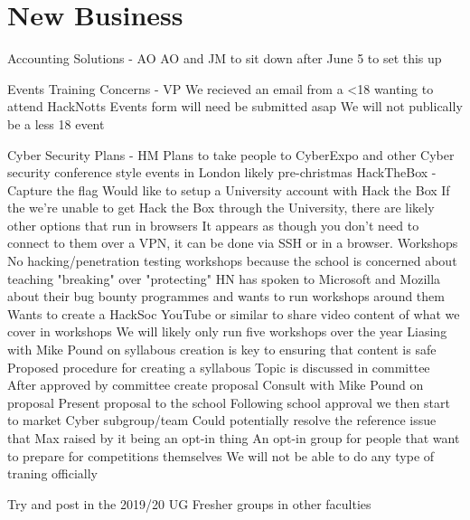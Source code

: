\documentclass[11pt,hacksoc]{meetingmins}
\begin{document}
\section{New Business}
\begin{items}
  \item Accounting Solutions - AO
    \subitem AO and JM to sit down after June 5 to set this up
  \item Events Training Concerns - VP
    \subitem We recieved an email from a <18 wanting to attend HackNotts
    \subitem Events form will need be submitted asap
    \subitem We will not publically be a less 18 event
  \item Cyber Security Plans - HM
    \subitem Plans to take people to CyberExpo and other Cyber security conference style events in London
      \subsubitem likely pre-christmas
    \subitem HackTheBox - Capture the flag
      \subsubitem Would like to setup a University account with Hack the Box
      \subsubitem If the we're unable to get Hack the Box through the University, there are likely other options that run in browsers
      \subsubitem It appears as though you don't need to connect to them over a VPN, it can be done via SSH or in a browser.
    \subitem Workshops
      \subsubitem No hacking/penetration testing workshops because the school is concerned about teaching "breaking" over "protecting"
      \subsubitem HN has spoken to Microsoft and Mozilla about their bug bounty programmes and wants to run workshops around them
      \subsubitem Wants to create a HackSoc YouTube or similar to share video content of what we cover in workshops
      \subsubitem We will likely only run five workshops over the year
      \subsubitem Liasing with Mike Pound on syllabous creation is key to ensuring that content is safe
    \subitem Proposed procedure for creating a syllabous
      \subsubitem Topic is discussed in committee
      \subsubitem After approved by committee create proposal
      \subsubitem Consult with Mike Pound on proposal
      \subsubitem Present proposal to the school
      \subsubitem Following school approval we then start to market
    \subitem Cyber subgroup/team
      \subsubitem Could potentially resolve the reference issue that Max raised by it being an opt-in thing
      \subsubitem An opt-in group for people that want to prepare for competitions themselves
      \subsubitem We will not be able to do any type of traning officially
  \item Try and post in the 2019/20 UG Fresher groups in other faculties
\end{items}

\vspace{1em}
\nextmeeting{}
\end{document}
